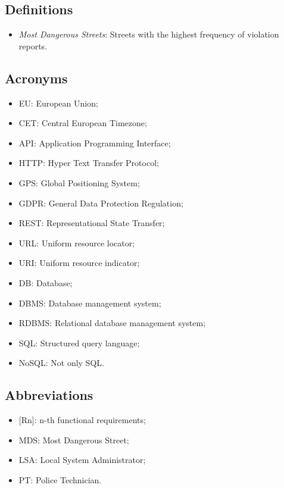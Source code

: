 \subsection{Definitions}
\begin{itemize}
  \item \textit{Most Dangerous Streets}: Streets with the highest frequency of violation reports.
\end{itemize}

\subsection{Acronyms}
\begin{itemize}
  \item EU: European Union;
  \item CET: Central European Timezone;
  \item API: Application Programming Interface;
  \item HTTP: Hyper Text Transfer Protocol;
  \item GPS: Global Positioning System;
  \item GDPR: General Data Protection Regulation;
  \item REST: Representational State Transfer;
  \item URL: Uniform resource locator;
  \item URI: Uniform resource indicator;
  \item DB: Database;
  \item DBMS: Database management system;
  \item RDBMS: Relational database management system;
  \item SQL: Structured query language;
  \item NoSQL: Not only SQL.
\end{itemize}

\subsection{Abbreviations}
\begin{itemize}
  \item {[Rn]}: n-th functional requirements;
  \item MDS: Most Dangerous Street;
  \item LSA: Local System Administrator;
  \item PT: Police Technician.
\end{itemize}
